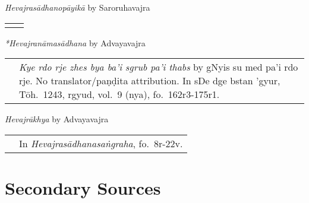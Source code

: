 \documentclass[12pt,twoside]{article}
\begin{document}
\noindent\emph{Hevajrasādhanopāyikā} by Saroruhavajra
\noindent\begin{longtable}{ p{} p{} }
	& \textcite*[vo.\ 1 pp.\ 99–121]{gerloff2020} 
\end{longtable}

\noindent\emph{*Hevajranāmasādhana} by Advayavajra
\noindent\begin{longtable}{ p{} p{} }
	& \emph{Kye rdo rje zhes bya ba'i sgrub pa'i thabs} by gNyis su med pa'i rdo rje. No translator/paṇḍita attribution.  In sDe dge bstan 'gyur, Tōh.\ 1243, rgyud, vol.\ 9 (nya), fo.\ 162r3-175r1. 
\end{longtable}

\noindent\emph{Hevajrākhya} by Advayavajra
\noindent\begin{longtable}{ p{} p{} }
	& In \emph{Hevajrasādhanasaṅgraha}, fo.\ 8r-22v.
\end{longtable}

	\section*{Secondary Sources}
	\printbibliography[notcategory=fullcited,resetnumbers,heading=none]
\end{document}
